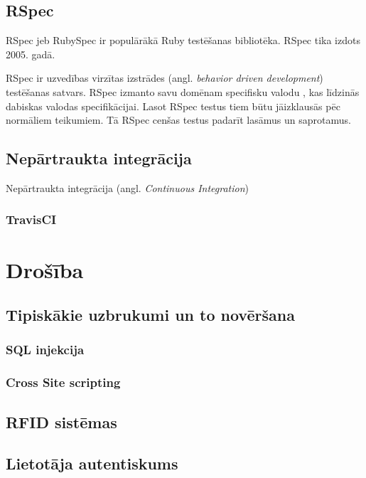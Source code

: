 \section{RSpec}
RSpec jeb RubySpec ir populārākā Ruby testēšanas bibliotēka. RSpec tika izdots 2005. gadā.
\cite{shayRspec}

RSpec ir uzvedības virzītas izstrādes (angl. \textit{behavior driven development}) testēšanas satvars. RSpec izmanto savu domēnam specifisku valodu , kas līdzinās dabiskas valodas specifikācijai. Lasot RSpec testus tiem būtu jāizklausās pēc normāliem teikumiem. Tā RSpec cenšas testus padarīt lasāmus un saprotamus.
\section{Nepārtraukta integrācija}
Nepārtraukta integrācija (angl. \textit{Continuous Integration})
\subsection{TravisCI}


\chapter{Drošība}

\section{Tipiskākie uzbrukumi un to novēršana}
\subsection{SQL injekcija}
\subsection{Cross Site scripting}

\section{RFID sistēmas}
\section{Lietotāja autentiskums}